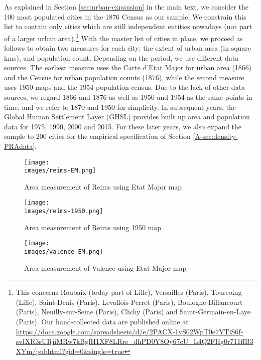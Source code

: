 \documentclass[11pt]{report}
\newcommand{\images}{../data/images}
\newcommand{\datatables}{../output/data/tables}
\begin{document}
As explained in Section \ref{sec:urban-expansion} in the main text, we consider the 100 most populated cities in the 1876 Census as our sample. We constrain this list to contain only cities which are still independent entities nowadays (not part of a larger urban area).\footnote{This concerns Roubaix (today part of Lille), Versailles (Paris), Tourcoing (Lille), Saint-Denis (Paris), Levallois-Perret (Paris), Boulogne-Billancourt (Paris), Neuilly-sur-Seine (Paris), Clichy (Paris) and Saint-Germain-en-Laye (Paris). Our hand-collected data are published online at \url{https://docs.google.com/spreadsheets/d/e/2PACX-1vS02WpT0e7YTiS6f-svIXR3sURjiMRw7kBgfH1XF8LRre_dhPD0Y8Oy67cU_L4Q2FHg0r711ffB3XYm/pubhtml?gid=0&single=true}} 
With the master list of cities in place, we proceed as follows to obtain two measures for each city: the extent of urban area (in square kms), and population count. Depending on the period, we use different data sources. The earliest measure uses the Carte d'Etat Major for urban area (1866) and the Census for urban population counts (1876), while the second measure uses 1950 maps and the 1954 population census. Due to the lack of other data sources, we regard 1866 and 1876 as well as 1950 and 1954 as the same points in time, and we refer to 1870 and 1950 for simplicity. In subsequent years, the Global Human Settlement Layer (GHSL) provides built up area and population data for 1975, 1990, 2000 and 2015. For these later years, we also expand the sample to 200 cities for the empirical specification of Section \ref{A-sec:density-PRAdata}. 


% 

\begin{figure}[p]
	\centering
	\texttt{[image: \\images/reims-EM.png]}
	\caption{Area measurement of Reims using Etat Major map\label{A-fig:Reims-EM}}
\end{figure}


\begin{figure}[p]
	\centering
	\texttt{[image: \\images/reims-1950.png]}
	\caption{Area measurement of Reims using 1950 map\label{A-fig:Reims-1950}}
\end{figure}




\begin{figure}[p]
	\centering
	\texttt{[image: \\images/valence-EM.png]}
	\caption{Area measurement of Valence using Etat Major map\label{A-fig:valence-EM}}
\end{figure}
\end{document}
